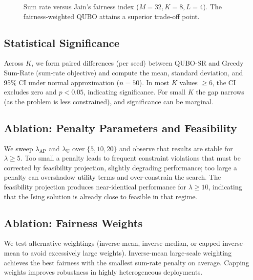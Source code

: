 {\begin{figure}[htbp]
\centering
{}
\caption{Sum rate versus Jain’s fairness index ($M=32, K=8, L=4$). The fairness-weighted QUBO attains a superior trade-off point.}
\label{fig:tradeoff}
\end{figure}

\subsection{Statistical Significance}
Across $K$, we form paired differences (per seed) between QUBO-SR and Greedy Sum-Rate (sum-rate objective) and compute the mean, standard deviation, and 95\% CI under normal approximation ($n=50$). In most $K$ values $\ge 6$, the CI excludes zero and $p<0.05$, indicating significance. For small $K$ the gap narrows (as the problem is less constrained), and significance can be marginal.

\subsection{Ablation: Penalty Parameters and Feasibility}
We sweep $\lambda_{\text{AP}}$ and $\lambda_{\text{U}}$ over $\{5,10,20\}$ and observe that results are stable for $\lambda\ge 5$. Too small a penalty leads to frequent constraint violations that must be corrected by feasibility projection, slightly degrading performance; too large a penalty can overshadow utility terms and over-constrain the search. The feasibility projection produces near-identical performance for $\lambda\ge 10$, indicating that the Ising solution is already close to feasible in that regime.

\subsection{Ablation: Fairness Weights}
We test alternative weightings (inverse-mean, inverse-median, or capped inverse-mean to avoid excessively large weights). Inverse-mean large-scale weighting achieves the best fairness with the smallest sum-rate penalty on average. Capping weights improves robustness in highly heterogeneous deployments.

}
